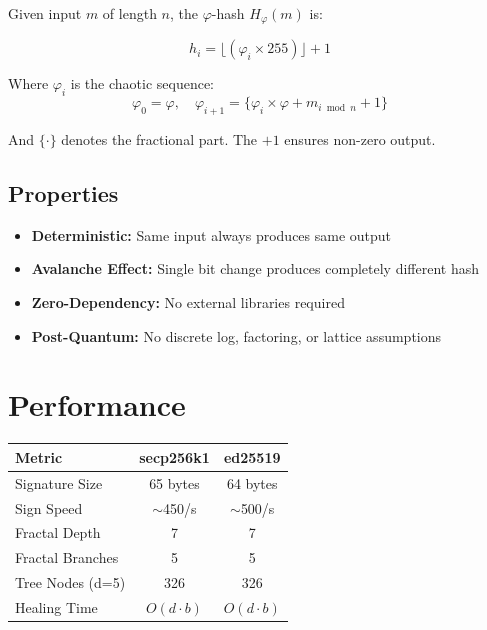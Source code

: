 \documentclass{article}
\begin{document}
Given input $m$ of length $n$, the $\varphi$-hash $H_{\varphi}(m)$ is:

\begin{equation}
h_i = \lfloor (\varphi_i \times 255) \rfloor + 1
\end{equation}

Where $\varphi_i$ is the chaotic sequence:
\begin{equation}
\varphi_0 = \varphi, \quad \varphi_{i+1} = \{\varphi_i \times \varphi + m_{i \bmod n} + 1\}
\end{equation}

And $\{\cdot\}$ denotes the fractional part. The $+1$ ensures non-zero output.

\subsection{Properties}

\begin{itemize}
\item \textbf{Deterministic:} Same input always produces same output
\item \textbf{Avalanche Effect:} Single bit change produces completely different hash
\item \textbf{Zero-Dependency:} No external libraries required
\item \textbf{Post-Quantum:} No discrete log, factoring, or lattice assumptions
\end{itemize}

\section{Performance}

\begin{center}
\begin{tabular}{|l|c|c|}
\hline
\textbf{Metric} & \textbf{secp256k1} & \textbf{ed25519} \\
\hline
Signature Size & 65 bytes & 64 bytes \\
Sign Speed & $\sim$450/s & $\sim$500/s \\
Fractal Depth & 7 & 7 \\
Fractal Branches & 5 & 5 \\
Tree Nodes (d=5) & 326 & 326 \\
Healing Time & $O(d \cdot b)$ & $O(d \cdot b)$ \\
\hline
\end{tabular}
\end{center}
\end{document}
